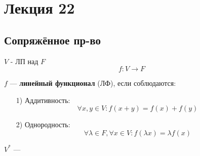 \section{Лекция 22}
\subsection{Сопряжённое пр-во}
$V$ - ЛП над $F$
\[
f: V \rightarrow F
\]
\begin{definition}
$f$ --- \textbf{линейный функционал} (ЛФ), если соблюдаются:
\begin{itemize}
  \item [1) ] Аддитивность:
    \[
    \forall x, y \in V \colon f(x + y) = f(x) + f(y)
    \]
  \item [2) ] Однородность:
    \[
    \forall \lambda \in F, \forall x \in V \colon f(\lambda x) = \lambda f(x)
    \]
\end{itemize} 
\end{definition}
\begin{definition}
$V^{*}$ --- 
\end{definition}
